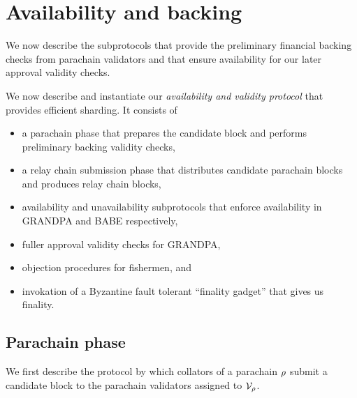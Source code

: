 
\section{Availability and backing}
\label{sec:availability_n_backing}

We now describe the subprotocols that provide the preliminary financial backing checks from parachain validators and that ensure availability for our later approval validity checks.


We now describe and instantiate our {\em availability and validity protocol} that provides efficient sharding.  It consists of 
\begin{itemize}
\item a parachain phase that prepares the candidate block and performs preliminary backing validity checks,
\item a relay chain submission phase that distributes candidate parachain blocks and produces relay chain blocks,
\item availability and unavailability subprotocols that enforce availability in GRANDPA and BABE respectively,
\item fuller approval validity checks for GRANDPA,
\item objection procedures for fishermen, and
\item invokation of a Byzantine fault tolerant ``finality gadget'' that gives us finality.
\end{itemize}




\subsection{Parachain phase} 
\label{sec:parachain}

We first describe the protocol by which collators of a parachain $\rho$ submit a candidate block to the parachain validators assigned to $\mathcal{V}_{\rho}$.

